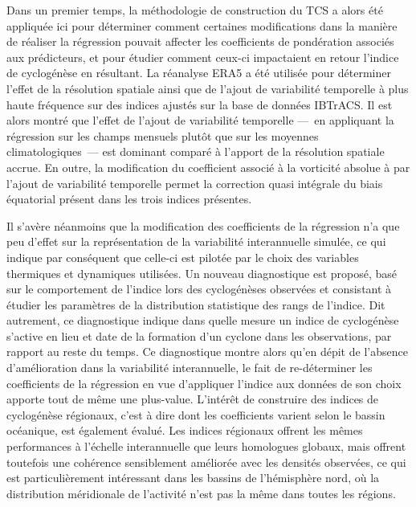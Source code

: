 \documentclass[../main.tex]{subfiles}
\begin{document}
Dans un premier temps, la méthodologie de construction du TCS a alors été appliquée ici pour déterminer comment certaines modifications dans la manière de
réaliser la régression pouvait affecter les coefficients de pondération associés aux prédicteurs, et pour étudier comment ceux-ci impactaient en retour l'indice
de cyclogénèse en résultant. La réanalyse ERA5 a été utilisée pour déterminer l'effet de la résolution spatiale ainsi que de l'ajout de variabilité temporelle à
plus haute fréquence sur des indices ajustés sur la base de données IBTrACS. Il est alors montré que l'effet de l'ajout de variabilité temporelle ---~en
appliquant la régression sur les champs mensuels plutôt que sur les moyennes climatologiques~--- est dominant comparé à l'apport de la résolution spatiale
accrue. En outre, la modification du coefficient associé à la vorticité absolue à  par l'ajout de variabilité temporelle permet la correction quasi
intégrale du biais équatorial présent dans les trois indices présentes.

Il s'avère néanmoins que la modification des coefficients de la régression n'a que peu d'effet sur la représentation de la variabilité interannuelle simulée, ce
qui indique par conséquent que celle-ci est pilotée par le choix des variables thermiques et dynamiques utilisées.  Un nouveau diagnostique est proposé, basé
sur le comportement de l'indice lors des cyclogénèses observées et consistant à étudier les paramètres de la distribution statistique des rangs de l'indice. Dit
autrement, ce diagnostique indique dans quelle mesure un indice de cyclogénèse s'active en lieu et date de la formation d'un cyclone dans les observations, par
rapport au reste du temps. Ce diagnostique montre alors qu'en dépit de l'absence d'amélioration dans la variabilité interannuelle, le fait de re-déterminer les
coefficients de la régression en vue d'appliquer l'indice aux données de son choix apporte tout de même une plus-value. L'intérêt de construire des indices de
cyclogénèse régionaux, c'est à dire dont les coefficients varient selon le bassin océanique, est également évalué. Les indices régionaux offrent les mêmes
performances à l'échelle interannuelle que leurs homologues globaux, mais offrent toutefois une cohérence sensiblement améliorée avec les densités observées, ce
qui est particulièrement intéressant dans les bassins de l'hémisphère nord, où la distribution méridionale de l'activité n'est pas la même dans toutes les
régions.
\end{document}
